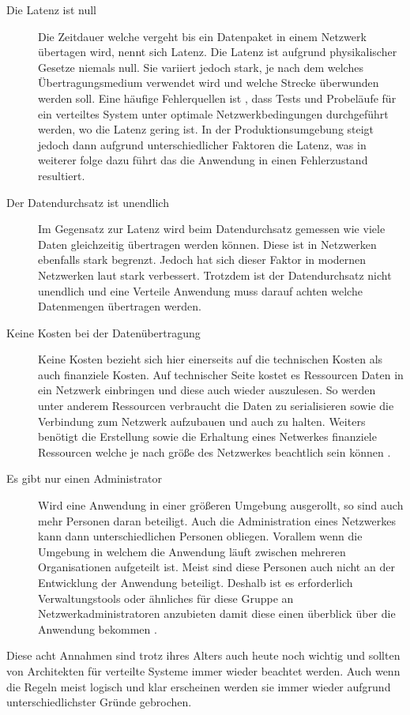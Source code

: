 \begin{description}
    \item[Die Latenz ist null]
    Die Zeitdauer welche vergeht bis ein Datenpaket in einem Netzwerk übertagen wird, nennt sich Latenz. Die Latenz ist aufgrund physikalischer Gesetze niemals null. Sie variiert jedoch stark, je nach dem welches Übertragungsmedium verwendet wird und welche Strecke überwunden werden soll. Eine häufige  Fehlerquellen ist \cite{rotem2006fallacies}, dass Tests und Probeläufe für ein verteiltes System unter optimale Netzwerkbedingungen durchgeführt werden, wo die Latenz gering ist. In der Produktionsumgebung steigt jedoch dann aufgrund unterschiedlicher Faktoren die Latenz, was in weiterer folge dazu führt das die Anwendung in einen Fehlerzustand resultiert. 
    \item[Der Datendurchsatz ist unendlich]
    Im Gegensatz zur Latenz wird beim Datendurchsatz gemessen wie viele Daten gleichzeitig übertragen werden können. Diese ist in Netzwerken ebenfalls stark begrenzt. Jedoch hat sich dieser Faktor in modernen Netzwerken laut \cite{rotem2006fallacies} stark verbessert. Trotzdem ist der Datendurchsatz nicht unendlich und eine Verteile Anwendung muss darauf achten welche Datenmengen übertragen werden.  
    \item[Keine Kosten bei der Datenübertragung]
    Keine Kosten bezieht sich hier einerseits auf die technischen Kosten als auch finanziele Kosten. Auf technischer Seite kostet es Ressourcen Daten in ein Netzwerk einbringen und diese auch wieder auszulesen. So werden unter anderem Ressourcen verbraucht die Daten zu serialisieren sowie die Verbindung zum Netzwerk aufzubauen und auch zu halten. Weiters benötigt die Erstellung sowie die Erhaltung eines Netwerkes finanziele Ressourcen welche je nach größe des Netzwerkes beachtlich sein können \cite{rotem2006fallacies}.
    \item[Es gibt nur einen Administrator]
    Wird eine Anwendung in einer größeren Umgebung ausgerollt, so sind auch mehr Personen daran beteiligt. Auch die Administration eines Netzwerkes kann dann unterschiedlichen Personen obliegen. Vorallem wenn die Umgebung in welchem die Anwendung läuft zwischen mehreren Organisationen aufgeteilt ist. Meist sind diese Personen auch nicht an der Entwicklung der Anwendung beteiligt. Deshalb ist es erforderlich Verwaltungstools oder ähnliches für diese Gruppe an Netzwerkadministratoren anzubieten damit diese einen überblick über die Anwendung bekommen \cite{rotem2006fallacies}.  
\end{description}
Diese acht Annahmen sind trotz ihres Alters auch heute noch wichtig und sollten von Architekten für verteilte Systeme immer wieder beachtet werden. Auch wenn die Regeln meist logisch und klar erscheinen werden sie immer wieder aufgrund unterschiedlichster Gründe gebrochen. \cite{rotem2006fallacies} 

